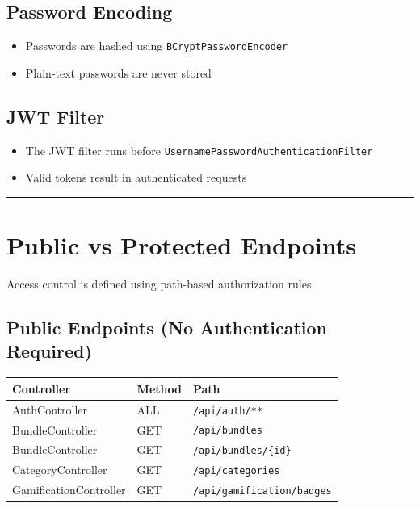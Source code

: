 \documentclass[a4paper,11pt]{article}
\begin{document}
\subsection{Password Encoding}

\begin{itemize}
  \item Passwords are hashed using \texttt{BCryptPasswordEncoder}
  \item Plain-text passwords are never stored
\end{itemize}

\subsection{JWT Filter}

\begin{itemize}
  \item The JWT filter runs before \texttt{UsernamePasswordAuthenticationFilter}
  \item Valid tokens result in authenticated requests
\end{itemize}

\hrule
\vspace{1em}

\section{Public vs Protected Endpoints}

Access control is defined using path-based authorization rules.

\subsection{Public Endpoints (No Authentication Required)}

\begin{longtable}{|p{4cm}|p{3cm}|p{6cm}|}
\hline
\textbf{Controller} & \textbf{Method} & \textbf{Path} \\
\hline
AuthController & ALL & \texttt{/api/auth/**} \\
BundleController & GET & \texttt{/api/bundles} \\
BundleController & GET & \texttt{/api/bundles/\{id\}} \\
CategoryController & GET & \texttt{/api/categories} \\
GamificationController & GET & \texttt{/api/gamification/badges} \\
\hline
\end{longtable}
\end{document}
